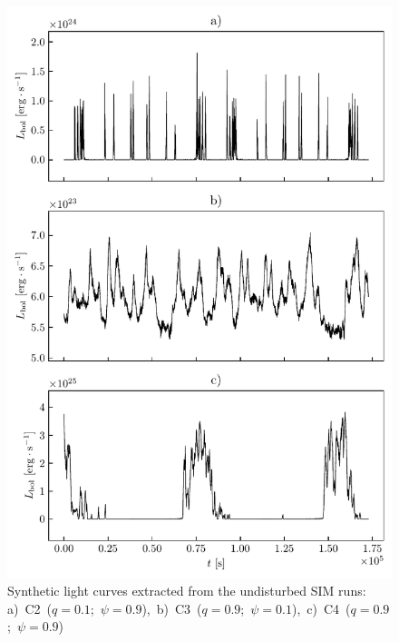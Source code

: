     \begin{figure}
    \begin{center}
        \includegraphics[width=1.0\textwidth]{img/plot_light_curves_undisturbed.pdf}
    \end{center}
    \caption{Synthetic light curves extracted from the undisturbed SIM runs: \mbox{a) C2 ($q = 0.1$; $\psi = 0.9$), b) C3 ($q = 0.9$; $\psi = 0.1$), c) C4 ($q = 0.9$; $\psi = 0.9$)}}
    \label{fig:plot_light_curves_undisturbed}
    \end{figure}
    
